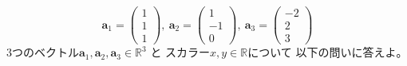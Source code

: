 \documentclass[12pt,b5paper]{ltjsarticle}
\begin{document}
\hrulefill
\begin{equation}
  \bm{a}_1=
   \begin{pmatrix}
    1\\1\\1
   \end{pmatrix}
   ,\
  \bm{a}_2=
  \begin{pmatrix}
   1\\-1\\0
  \end{pmatrix}
  ,\
  \bm{a}_3=
  \begin{pmatrix}
   -2\\2\\3
  \end{pmatrix}
\end{equation}
3つのベクトル$\bm{a}_1,\bm{a}_2,\bm{a}_3\in\mathbb{R}^3$
と
スカラー$x,y\in\mathbb{R}$について
以下の問いに答えよ。
\end{document}
